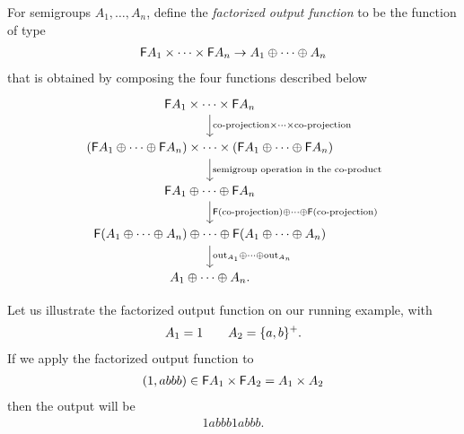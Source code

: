 For semigroups $A_1,\ldots,A_n$, define the \emph{factorized output function} to be the 
function of type 
\begin{align*}
\mathsf F A_1 \times \cdots \times \mathsf F A_n \to A_1 \oplus \cdots \oplus A_n
\end{align*}
that is obtained by composing the  four functions described below
\[
\begin{tikzcd}
\functor A_1 \times \cdots \times \functor A_n
\ar[d,"\text{co-projection} \times \cdots \times \text{co-projection}"]
\\
(\functor A_1 \oplus \cdots \oplus \functor A_n)
\times
\cdots
\times 
(\functor A_1 \oplus \cdots \oplus \functor A_n)
\ar[d,"\text{semigroup operation in the co-product}"]
\\
\functor A_1 \oplus \cdots \oplus \functor A_n
\ar[d, "\functor (\text{co-projection}) \oplus \cdots \oplus \functor (\text{co-projection}) "]\\
\functor (A_1 \oplus \cdots \oplus A_n) \oplus \cdots \oplus \functor (A_1 \oplus \cdots \oplus A_n)
\ar[d, "\outfun_{A_1} \oplus \cdots \oplus \outfun_{A_n}"]\\ 
A_1 \oplus \cdots \oplus A_n.
\end{tikzcd}
\]

Let us illustrate the factorized output function on our running example, with 
\begin{align*}
A_1 = 1 \qquad A_2 = \{a,b\}^+.
\end{align*}
If we apply the factorized output function to 
\begin{align*}
(1, abbb)  \in \mathsf F A_1 \times \mathsf F A_2 = A_1 \times A_2
\end{align*}
then the output will be 
\begin{align*}
1 abbb 1 abbb.
\end{align*}

